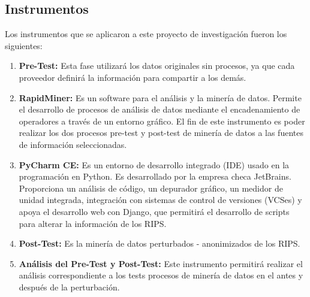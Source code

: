 \documentclass[a4paper,openright,12pt]{book}
\theoremstyle{definition}
\theoremstyle{remark}
\begin{document}
    \subsection{Instrumentos}
    Los instrumentos que se aplicaron a este proyecto de investigación fueron los siguientes:
    \begin{enumerate}
      \item \textbf{Pre-Test:} Esta fase utilizará los datos originales sin procesos, ya que cada proveedor definirá la información para compartir a los demás.
		\item \textbf{RapidMiner:} Es un software para el análisis y la minería de datos. Permite el desarrollo de procesos de análisis de datos mediante el encadenamiento de operadores a través de un entorno gráfico. El fin de este instrumento es poder realizar los dos procesos pre-test y post-test de minería de datos a las fuentes de información seleccionadas.
        \item \textbf{PyCharm CE:} Es un entorno de desarrollo integrado (IDE) usado en la programación en Python. Es desarrollado por la empresa checa JetBrains. Proporciona un análisis de código, un depurador gráfico, un medidor de unidad integrada, integración con sistemas de control de versiones (VCSes) y apoya el desarrollo web con Django, que permitirá el desarrollo de scripts para alterar la información de los RIPS.       
        \item \textbf{Post-Test:} Es la minería de datos perturbados - anonimizados de los RIPS.
        \item \textbf{Análisis del Pre-Test y Post-Test:} Este instrumento permitirá realizar el análisis correspondiente a los tests procesos de minería de datos en el antes y después de la perturbación.
\end{enumerate}
\end{document}

